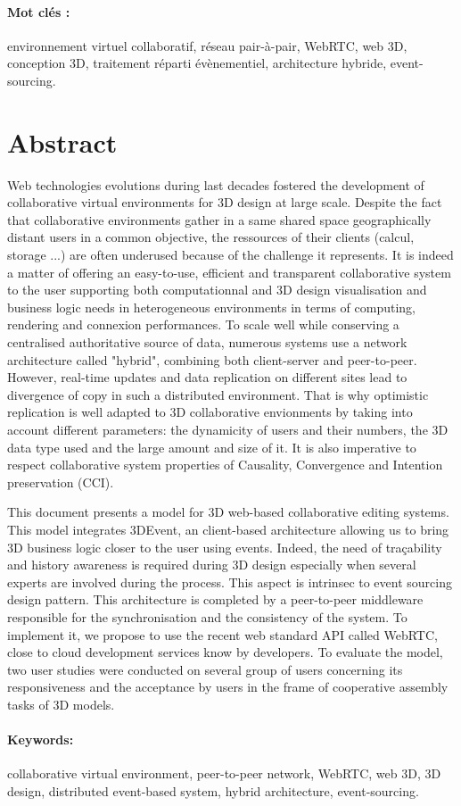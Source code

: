 \paragraph{Mot clés : }environnement virtuel collaboratif, réseau pair-à-pair, WebRTC, web 3D, conception 3D, traitement réparti évènementiel, architecture hybride, event-sourcing.

\section*{Abstract}

Web technologies evolutions during last decades fostered the development of 
collaborative virtual environments for 3D design at large scale. Despite the fact 
that collaborative environments gather in a same shared space geographically 
distant users in a common objective, the ressources of their clients (calcul, 
storage ...) are often underused because of the challenge it represents. It is indeed 
a matter of offering an easy-to-use, efficient and transparent collaborative system 
to the user supporting both computationnal and 3D design visualisation and 
business logic needs in heterogeneous environments in terms of computing, 
rendering and connexion performances. To scale well while conserving a 
centralised authoritative source of data, numerous systems use a network 
architecture called "hybrid", combining both client-server and peer-to-peer. 
However, real-time updates and data replication on different sites lead to 
divergence of copy in such a distributed environment. That is why optimistic 
replication is well adapted to 3D collaborative envionments by taking into account 
different parameters: the dynamicity of users and their numbers, the 3D data type 
used and the large amount and size of it. It is also imperative to respect 
collaborative system properties of Causality, Convergence and Intention 
preservation (CCI).

This document presents a model for 3D web-based collaborative editing systems. This model integrates 3DEvent, an client-based architecture allowing us to bring 3D business logic closer to the user using events. Indeed, the need of traçability and history awareness is required during 3D design especially when several experts are involved during the process. This aspect is intrinsec to event sourcing design pattern. This architecture is completed by a peer-to-peer middleware responsible for the synchronisation and the consistency of the system. To implement it, we propose to use the recent web standard API called WebRTC, close to cloud development services know by developers. To evaluate the model, two user studies were conducted on several group of users concerning its responsiveness and the acceptance by users in the frame of cooperative assembly tasks of 3D models.




\paragraph{Keywords: }collaborative virtual environment, peer-to-peer network, WebRTC, web 3D, 3D design, distributed event-based system, hybrid architecture, event-sourcing.

\clearpage